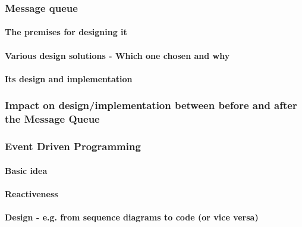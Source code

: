 \subsubsection{Message queue}

\paragraph{The premises for designing it}

\paragraph{Various design solutions - Which one chosen and why}

\paragraph{Its design and implementation}

\subsubsection{Impact on design/implementation between before and after the Message Queue}

\subsubsection{Event Driven Programming}

\paragraph{Basic idea}

\paragraph{Reactiveness}

\paragraph{Design - e.g. from sequence diagrams to code (or vice versa)}
